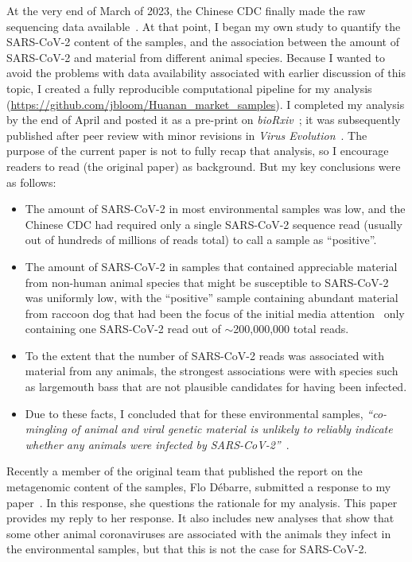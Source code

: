 \documentclass[9pt,onecolumn,twoside]{gsajnl_modified}
\begin{document}
At the very end of March of 2023, the Chinese CDC finally made the raw sequencing data available~\citep{liu2023surveillance-chinaxiv, liu2023surveillance}.
At that point, I began my own study to quantify the SARS-CoV-2 content of the samples, and the association between the amount of SARS-CoV-2 and material from different animal species.
Because I wanted to avoid the problems with data availability associated with earlier discussion of this topic, I created a fully reproducible computational pipeline for my analysis (\url{https://github.com/jbloom/Huanan_market_samples}).
I completed my analysis by the end of April and posted it as a pre-print on \textit{bioRxiv}~\citep{bloom2023biorxiv}; it was subsequently published after peer review with minor revisions in \textit{Virus Evolution}~\citep{bloom2023association}.
The purpose of the current paper is not to fully recap that analysis, so I encourage readers to read \citet{bloom2023association} (the original paper) as background.
But my key conclusions were as follows:
\begin{itemize}
\item The amount of SARS-CoV-2 in most environmental samples was low, and the Chinese CDC had required only a single SARS-CoV-2 sequence read (usually out of hundreds of millions of reads total) to call a sample as ``positive''.
\item The amount of SARS-CoV-2 in samples that contained appreciable material from non-human animal species that might be susceptible to SARS-CoV-2 was uniformly low, with the ``positive'' sample containing abundant material from raccoon dog that had been the focus of the initial media attention~\citep{wu2023atlantic, mueller2023nytimes} only containing one SARS-CoV-2 read out of $\sim$200,000,000 total reads.
\item To the extent that the number of SARS-CoV-2 reads was associated with material from any animals, the strongest associations were with species such as largemouth bass that are not plausible candidates for having been infected.
\item Due to these facts, I concluded that for these environmental samples, \textit{``co-mingling of animal and viral genetic material is unlikely to reliably indicate whether any animals were infected by SARS-CoV-2''}~\citep{bloom2023association}.
\end{itemize}

Recently a member of the original team that published the \citet{crits2023genetic} report on the metagenomic content of the samples, Flo D\'ebarre, submitted a response to my paper~\citep{debarre2024what}.
In this response, she questions the rationale for my analysis.
This paper provides my reply to her response.
It also includes new analyses that show that some other animal coronaviruses are associated with the animals they infect in the environmental samples, but that this is not the case for SARS-CoV-2.
\end{document}
